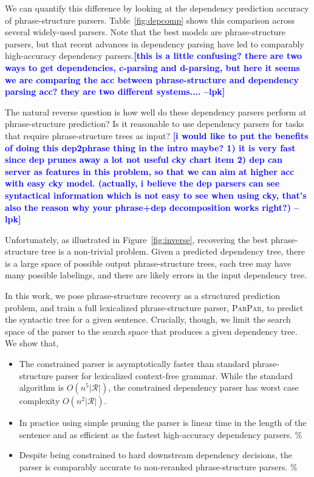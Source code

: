 \documentclass[11pt,letterpaper]{article}
\newcommand{\rules}{\mathcal{R}}
\newcommand{\ParseName}{\textsc{ParPar}}
\newcommand{\lpkcomment}[1]{\textcolor{blue}{\bf \small [#1 --lpk]}}
\begin{document}
We can quantify this difference by looking
at the dependency prediction accuracy of phrase-structure parsers. Table~\ref{fig:depcomp} shows this comparison across several widely-used parsers. Note that the best models are phrase-structure parsers, but that recent advances in dependency parsing have led to comparably high-accuracy dependency parsers.\lpkcomment{this is a little confusing? there are two ways to get dependencies, c-parsing and d-parsing, but here it seems we are comparing the acc between phrase-structure and dependency parsing acc? they are two different systems....}

The natural reverse question is how well do these dependency parsers perform at phrase-structure prediction? Is it reasonable to use dependency parsers for tasks that require phrase-structure trees as input? \lpkcomment{i would like to put the benefits of doing this dep2phrase thing in the intro maybe? 1) it is very fast since dep prunes away a lot not useful cky chart item 2) dep can server as features in this problem, so that we can aim at higher acc with easy cky model. (actually, i believe the dep parsers can see syntactical information which is not easy to see when using cky, that's also the reason why your phrase+dep decomposition works right?)}



Unfortunately, as illustrated in Figure~\ref{fig:inverse},
recovering the best phrase-structure tree is a non-trivial problem. Given a
predicted dependency tree, there is a large space of possible output
phrase-structure trees, each tree may have many possible labelings,
and there are likely errors in the input dependency tree.



In this work, we pose phrase-structure recovery as a structured
prediction problem, and train a full lexicalized phrase-structure
parser, \ParseName,  to predict the syntactic tree for a given sentence. Crucially,
though, we limit the search space of the parser to the search space
that produces a given dependency tree. We show that,



\begin{itemize}
\item The constrained parser is asymptotically  faster than
standard phrase-structure parser for lexicalized context-free grammar.
While the standard algorithm is $O(n^5 |\rules|)$, the
constrained dependency parser has worst case complexity $O(n^2 |\rules|)$.

\item In practice using simple pruning the parser is
linear time in the length of the sentence and as efficient as the fastest
high-accuracy dependency parsers. \%

\item Despite being constrained to hard downstream dependency decisions,
the parser is comparably accurate to non-reranked phrase-structure parsers. \%


\end{itemize}
\end{document}
